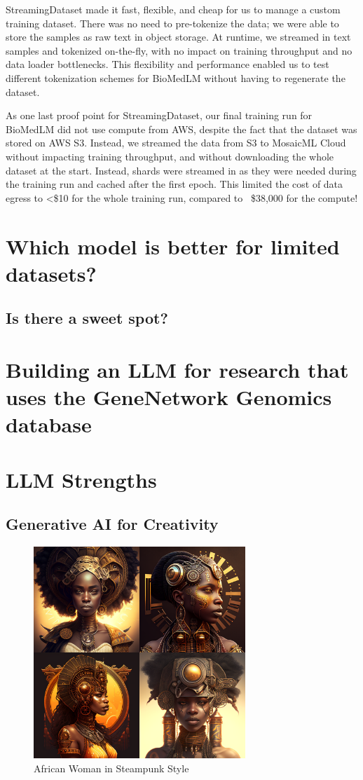 \documentclass[letterpaper]{article}
\begin{document}
StreamingDataset made it fast, flexible, and cheap for us to manage a custom training dataset. 
There was no need to pre-tokenize the data; we were able to store the samples as raw text in object storage. 
At runtime, we streamed in text samples and tokenized on-the-fly, with no impact on training throughput and no data loader bottlenecks. 
This flexibility and performance enabled us to test different tokenization schemes for BioMedLM without having to regenerate the dataset.

As one last proof point for StreamingDataset, our final training run for BioMedLM did not use compute from AWS, despite the fact that the dataset was stored on AWS S3. 
Instead, we streamed the data from S3 to MosaicML Cloud without impacting training throughput, and without downloading the whole dataset at the start. 
Instead, shards were streamed in as they were needed during the training run and cached after the first epoch. 
This limited the cost of data egress to <\$10 for the whole training run, compared to ~\$38,000 for the compute!

\section{Which model is better for limited datasets?}
\subsection{Is there a sweet spot?}

\section{Building an LLM for research that uses the GeneNetwork Genomics database}

\section{LLM Strengths}
\subsection{Generative AI for Creativity}
\begin{figure}[ht]
\includegraphics[width=8cm]{imgs/African_Woman_Steampunk.png}
\caption{African Woman in Steampunk Style}
\end{figure}
\end{document}
